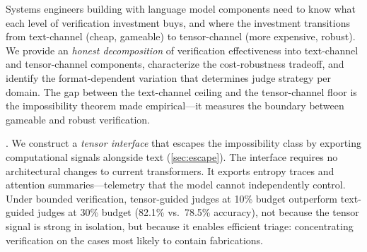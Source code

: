 
Systems engineers building with language
model components need to know what each level of verification investment
buys, and where the investment transitions from text-channel (cheap,
gameable) to tensor-channel (more expensive, robust).
We provide an \emph{honest decomposition}
of verification effectiveness into text-channel and tensor-channel
components, characterize the cost-ro\-bust\-ness tradeoff, and identify
the format-dependent variation that determines judge strategy per domain.
The gap between the text-channel
ceiling and the tensor-channel floor is the impossibility theorem made
empirical---it measures the boundary between gameable and robust verification.

. We construct a \emph{tensor interface} that escapes the impossibility
class by exporting computational signals alongside text
(\autoref{sec:escape}). The interface requires no architectural changes to
current transformers. It exports entropy traces and attention summaries---telemetry
that the model cannot independently control. Under bounded verification,
tensor-guided judges at 10\% budget outperform text-guided judges at 30\%
budget (82.1\% vs.\ 78.5\% accuracy), not because the tensor signal is
strong in isolation, but because it enables efficient triage: concentrating
verification on the cases most likely to contain fabrications.




